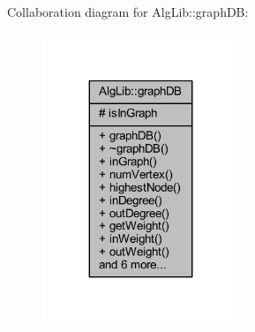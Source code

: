 Collaboration diagram for Alg\+Lib\+:\+:graph\+DB\+:\nopagebreak
\begin{figure}[H]
\begin{center}
\leavevmode
\includegraphics[width=167pt]{class_alg_lib_1_1graph_d_b__coll__graph}
\end{center}
\end{figure}
